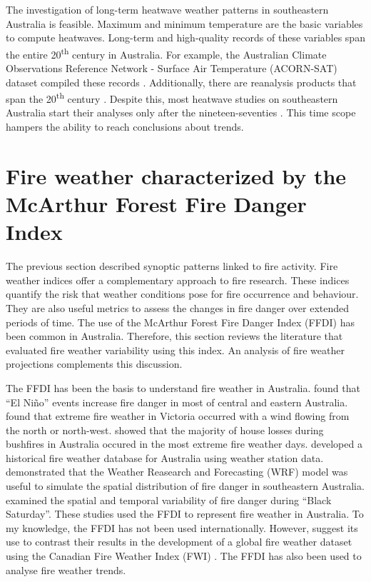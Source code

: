 The investigation of long-term heatwave weather patterns in southeastern
Australia is feasible. Maximum and minimum temperature are the basic
variables to compute heatwaves. Long-term and high-quality records
of these variables span the entire 20\textsuperscript{th} century
in Australia. For example, the Australian Climate Observations Reference
Network - Surface Air Temperature (ACORN-SAT) dataset compiled these
records \citep{Trewin2013}. Additionally, there are reanalysis products
that span the 20\textsuperscript{th} century \citep{Compo2011,Stickler2014}.
Despite this, most heatwave studies on southeastern Australia start
their analyses only after the nineteen-seventies \citep{Pezza2012,Parker2013,Boschat2014,Parker2014a}.
This time scope hampers the ability to reach conclusions about trends. 


\section{Fire weather characterized by the McArthur Forest Fire Danger Index}

The previous section described synoptic patterns linked to fire activity.
Fire weather indices offer a complementary approach to fire research.
These indices quantify the risk that weather conditions pose for fire
occurrence and behaviour. They are also useful metrics to assess the
changes in fire danger over extended periods of time. The use of the
McArthur Forest Fire Danger Index (FFDI) has been common in Australia.
Therefore, this section reviews the literature that evaluated fire
weather variability using this index. An analysis of fire weather
projections complements this discussion.

The FFDI has been the basis to understand fire weather in Australia.
\citet{Williams1999} found that \textquotedblleft El Ni\~no\textquotedblright{}
events increase fire danger in most of central and eastern Australia.
\citet{Long2006} found that extreme fire weather in Victoria occurred
with a wind flowing from the north or north-west. \citet{Blanchi2010}
showed that the majority of house losses during bushfires in Australia
occured in the most extreme fire weather days. \citet{Lucas2010}
developed a historical fire weather database for Australia using weather
station data. \citet{Clarke2013a} demonstrated that the Weather Reasearch
and Forecasting (WRF) model \citep{Skamarock2008} was useful to simulate
the spatial distribution of fire danger in southeastern Australia.
\citet{Engel2013} examined the spatial and temporal variability of
fire danger during ``Black Saturday''. These studies used the FFDI
to represent fire weather in Australia. To my knowledge, the FFDI
has not been used internationally. However, \citet*{Field2015} suggest
its use to contrast their results in the development of a global fire
weather dataset using the Canadian Fire Weather Index (FWI) \citep{VanWagner1974}.
The FFDI has also been used to analyse fire weather trends.

